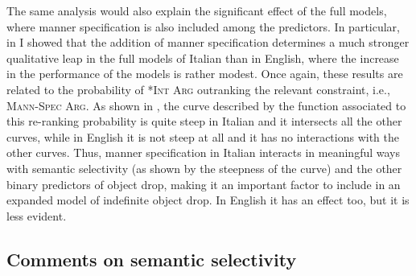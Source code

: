 The same analysis would also explain the significant effect of the full models, where manner specification is also included among the predictors. In particular, in  I showed that the addition of manner specification determines a much stronger qualitative leap in the full models of Italian than in English, where the increase in the performance of the models is rather modest. Once again, these results are related to the probability of \textsc{*Int Arg} outranking the relevant constraint, i.e., \textsc{Mann-Spec Arg}. As shown in , the curve described by the function associated to this re-ranking probability is quite steep in Italian and it intersects all the other curves, while in English it is not steep at all and it has no interactions with the other curves. Thus, manner specification in Italian interacts in meaningful ways with semantic selectivity (as shown by the steepness of the curve) and the other binary predictors of object drop, making it an important factor to include in an expanded model of indefinite object drop. In English it has an effect too, but it is less evident.


\subsection{Comments on semantic selectivity}


